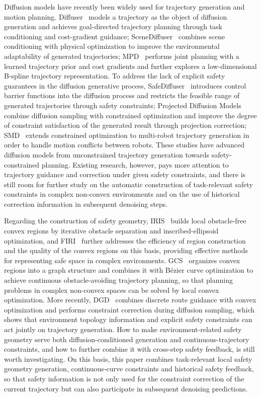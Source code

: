 \documentclass[journal]{IEEEtran}
\begin{document}
Diffusion models have recently been widely used for trajectory generation and motion planning. Diffuser~\cite{janner2022diffuser} models a trajectory as the object of diffusion generation and achieves goal-directed trajectory planning through task conditioning and cost-gradient guidance; SceneDiffuser~\cite{huang2023scenediffuser} combines scene conditioning with physical optimization to improve the environmental adaptability of generated trajectories; MPD~\cite{carvalho2025mpd} performs joint planning with a learned trajectory prior and cost gradients and further explores a low-dimensional B-spline trajectory representation. To address the lack of explicit safety guarantees in the diffusion generative process, SafeDiffuser~\cite{xiao2025safediffuser} introduces control barrier functions into the diffusion process and restricts the feasible range of generated trajectories through safety constraints; Projected Diffusion Models~\cite{christopher2024projected} combine diffusion sampling with constrained optimization and improve the degree of constraint satisfaction of the generated result through projection correction; SMD~\cite{liang2025smd} extends constrained optimization to multi-robot trajectory generation in order to handle motion conflicts between robots. These studies have advanced diffusion models from unconstrained trajectory generation towards safety-constrained planning. Existing research, however, pays more attention to trajectory guidance and correction under given safety constraints, and there is still room for further study on the automatic construction of task-relevant safety constraints in complex non-convex environments and on the use of historical correction information in subsequent denoising steps.

Regarding the construction of safety geometry, IRIS~\cite{deits2015iris} builds local obstacle-free convex regions by iterative obstacle separation and inscribed-ellipsoid optimization, and FIRI~\cite{wang2025firi} further addresses the efficiency of region construction and the quality of the convex regions on this basis, providing effective methods for representing safe space in complex environments. GCS~\cite{marcucci2023gcs} organizes convex regions into a graph structure and combines it with B\'ezier curve optimization to achieve continuous obstacle-avoiding trajectory planning, so that planning problems in complex non-convex spaces can be solved by local convex optimization. More recently, DGD~\cite{liang2026dgd} combines discrete route guidance with convex optimization and performs constraint correction during diffusion sampling, which shows that environment topology information and explicit safety constraints can act jointly on trajectory generation. How to make environment-related safety geometry serve both diffusion-conditioned generation and continuous-trajectory constraints, and how to further combine it with cross-step safety feedback, is still worth investigating. On this basis, this paper combines task-relevant local safety geometry generation, continuous-curve constraints and historical safety feedback, so that safety information is not only used for the constraint correction of the current trajectory but can also participate in subsequent denoising predictions.
\end{document}
